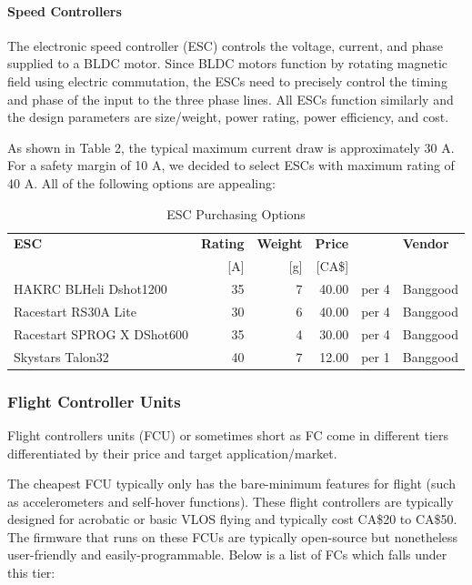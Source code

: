 \paragraph{Speed Controllers}

The electronic speed controller (ESC) controls the voltage, current, and phase supplied to a BLDC motor. Since BLDC motors function by rotating magnetic field using electric commutation, the ESCs need to precisely control the timing and phase of the input to the three phase lines. All ESCs function similarly and the design parameters are size/weight, power rating, power efficiency, and cost.

As shown in Table 2, the typical maximum current draw is approximately 30 A. For a 
safety margin of 10 A, we decided to select ESCs with maximum rating of 40 A. All of the following options are appealing:

\begin{table}[h]
    \centering
    \caption{ESC Purchasing Options}
    \label{table:esc-table}

    \begin{tabular}{lrrrll}

    \hline
    \textbf{ESC} & \textbf{Rating} & \textbf{Weight} & \textbf{Price}  & & \textbf{Vendor}\\
    & [A] & [g] & [CA\$] & & \\
    \hline
    HAKRC BLHeli Dshot1200 & 35 & 7  & 40.00 & per 4 & Banggood\\
    Racestart RS30A Lite & 30 & 6  & 40.00 & per 4 & Banggood\\
    Racestart SPROG X DShot600 & 35 & 4  & 30.00 & per 4 & Banggood\\
    Skystars Talon32 & 40 & 7  & 12.00 & per 1 & Banggood\\
    \hline

    \end{tabular} 
\end{table}

\subsubsection{Flight Controller Units}

Flight controllers units (FCU) or sometimes short as FC come in different tiers differentiated by their price and target application/market. 

The cheapest FCU typically only has the bare-minimum features for flight (such as accelerometers and self-hover functions). These flight controllers are typically designed for acrobatic or basic VLOS flying and typically cost CA\$20 to CA\$50. The firmware that runs on these FCUs are typically open-source but nonetheless user-friendly and easily-programmable. Below is a list of FCs which falls under this tier:

